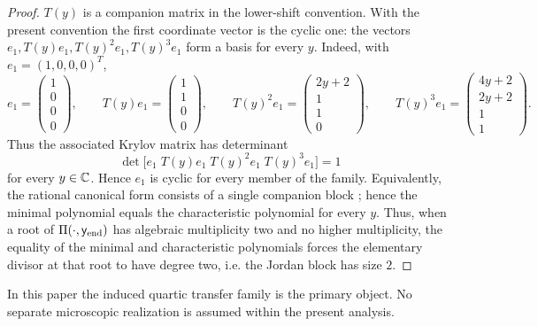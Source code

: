 \begin{proof}
$T(y)$ is a companion matrix in the lower-shift convention.  With the present convention the first coordinate vector is the cyclic one: the vectors $e_1,T(y)e_1,T(y)^2e_1,T(y)^3e_1$ form a basis for every $y$.  Indeed, with $e_1=(1,0,0,0)^T$,
\[
e_1=\begin{pmatrix}1\\0\\0\\0\end{pmatrix},\qquad
T(y)e_1=\begin{pmatrix}1\\1\\0\\0\end{pmatrix},\qquad
T(y)^2e_1=\begin{pmatrix}2y+2\\1\\1\\0\end{pmatrix},\qquad
T(y)^3e_1=\begin{pmatrix}4y+2\\2y+2\\1\\1\end{pmatrix}.
\]
Thus the associated Krylov matrix has determinant
\[
\det\bigl[e_1\; T(y)e_1\; T(y)^2e_1\; T(y)^3e_1\bigr]=1
\]
for every $y\in\mathbb{C}$.  Hence $e_1$ is cyclic for every member of the family.  Equivalently, the rational canonical form consists of a single companion block \cite[Sec.~3.3]{HornJohnson2012}; hence the minimal polynomial equals the characteristic polynomial for every $y$.
Thus, when a root of \(\Pi(\cdot,\mathsf{y}_{\mathrm{end}})\) has algebraic multiplicity two and no higher multiplicity, the equality of the minimal and characteristic polynomials forces the elementary divisor at that root to have degree two, i.e. the Jordan block has size \(2\).
\end{proof}

In this paper the induced quartic transfer family is the primary object.
No separate microscopic realization is assumed within the present analysis.

